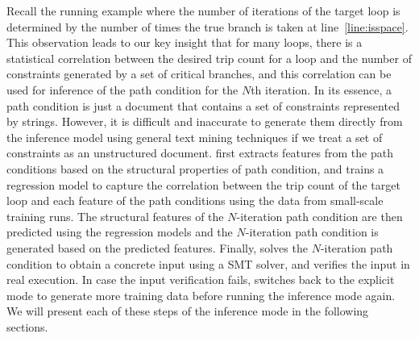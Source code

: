 Recall the running example where the number of iterations of the target loop is determined by the number of times the true branch is taken at line~\ref{line:isspace}.
This observation leads to our key insight that for many loops, there is a statistical correlation between the desired trip count for a loop and the number of constraints generated by a set of critical branches, and this correlation can be used for inference of the path condition for the $N$th iteration.
In its essence, a path condition is just a document that contains a set of constraints represented by strings.
However, it is difficult and inaccurate to generate them directly from the inference model using general text mining techniques if we treat a set of constraints as an unstructured document.
\lancet first extracts features from the path conditions based on the structural properties of path condition, and trains a regression model to capture the correlation between the trip count of the target loop and each feature of the path conditions using the data from small-scale training runs.
The structural features of the $N$-iteration path condition are then predicted using the regression models and the $N$-iteration path condition is generated based on the predicted features.
Finally, \lancet solves the $N$-iteration path condition to obtain a concrete input using a SMT solver, and verifies the input in real execution.
In case the input verification fails, \lancet switches back to the explicit mode to generate more training data before running the inference mode again.
We will present each of these steps of the inference mode in the following sections.

